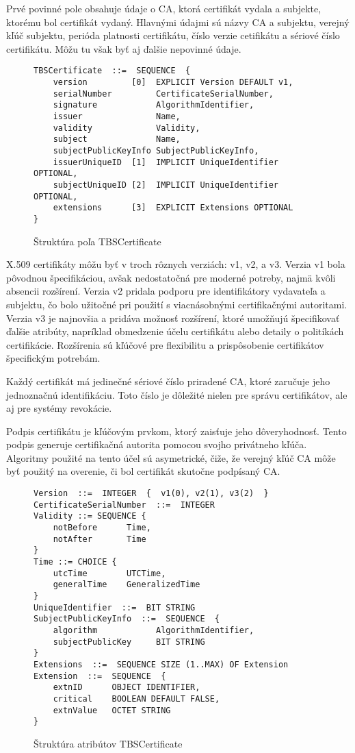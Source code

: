 \documentclass[12pt, twoside]{book}
\begin{document}
Prvé povinné pole obsahuje údaje o CA, ktorá certifikát vydala a subjekte, ktorému bol certifikát vydaný. Hlavnými údajmi sú názvy CA a subjektu, verejný kľúč subjektu, perióda platnosti certifikátu, číslo verzie cetifikátu a sériové číslo certifikátu. Môžu tu však byť aj ďalšie nepovinné údaje.\cite{x509} 

\begin{figure}[H]
\begin{lstlisting}
TBSCertificate  ::=  SEQUENCE  {
    version         [0]  EXPLICIT Version DEFAULT v1,
    serialNumber         CertificateSerialNumber,
    signature            AlgorithmIdentifier,
    issuer               Name,
    validity             Validity,
    subject              Name,
    subjectPublicKeyInfo SubjectPublicKeyInfo,
    issuerUniqueID  [1]  IMPLICIT UniqueIdentifier OPTIONAL,
    subjectUniqueID [2]  IMPLICIT UniqueIdentifier OPTIONAL,
    extensions      [3]  EXPLICIT Extensions OPTIONAL
}
\end{lstlisting}
\caption{Štruktúra poľa TBSCertificate}
\end{figure}

X.509 certifikáty môžu byť v troch rôznych verziách: v1, v2, a v3. Verzia v1 bola pôvodnou špecifikáciou, avšak nedostatočná pre moderné potreby, najmä kvôli absencii rozšírení. Verzia v2 pridala podporu pre identifikátory vydavateľa a subjektu, čo bolo užitočné pri použití s viacnásobnými certifikačnými autoritami. Verzia v3 je najnovšia a pridáva možnosť rozšírení, ktoré umožňujú špecifikovať ďalšie atribúty, napríklad obmedzenie účelu certifikátu alebo detaily o politíkách certifikácie. Rozšírenia sú kľúčové pre flexibilitu a prispôsobenie certifikátov špecifickým potrebám.\cite{rfc5280}

Každý certifikát má jedinečné sériové číslo priradené CA, ktoré zaručuje jeho jednoznačnú identifikáciu. Toto číslo je dôležité nielen pre správu certifikátov, ale aj pre systémy revokácie.\cite{x509} 

Podpis certifikátu je kľúčovým prvkom, ktorý zaisťuje jeho dôveryhodnosť. Tento podpis generuje certifikačná autorita pomocou svojho privátneho kľúča. Algoritmy použité na tento účel sú asymetrické, čiže, že verejný kľúč CA môže byť použitý na overenie, či bol certifikát skutočne podpísaný CA.\cite{x509}  

\begin{figure}[H]
\begin{lstlisting}
Version  ::=  INTEGER  {  v1(0), v2(1), v3(2)  }
CertificateSerialNumber  ::=  INTEGER
Validity ::= SEQUENCE {
    notBefore      Time,
    notAfter       Time 
}
Time ::= CHOICE {
    utcTime        UTCTime,
    generalTime    GeneralizedTime
}
UniqueIdentifier  ::=  BIT STRING
SubjectPublicKeyInfo  ::=  SEQUENCE  {
    algorithm            AlgorithmIdentifier,
    subjectPublicKey     BIT STRING
}
Extensions  ::=  SEQUENCE SIZE (1..MAX) OF Extension
Extension  ::=  SEQUENCE  {
    extnID      OBJECT IDENTIFIER,
    critical    BOOLEAN DEFAULT FALSE,
    extnValue   OCTET STRING
}
\end{lstlisting}
\caption{Štruktúra atribútov TBSCertificate}
\end{figure}
\end{document}
